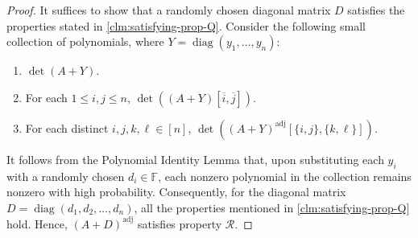 \documentclass[11pt,letterpaper]{article}
\DeclareMathOperator*{\diag}{diag}
\newcommand{\comp}[1]{\overline{#1}}
\newcommand{\F}{\mathbb{F}}
\DeclareMathOperator{\ad}{adj}
\newcommand{\adj}[1]{(#1)^{\ad}}
\newcommand{\PME}{\stackrel{\mathclap{\scalebox{.4}{\mbox{PME}}}}{=}}
\newcommand{\kPME}[3]{\mathrm{PME}(#1, #2, #3)}
\newcommand{\prop}{\mathcal{R}}
\begin{document}
{{{\begin{proof}
    It suffices to show that a randomly chosen diagonal matrix $D$ satisfies the properties stated in \cref{clm:satisfying-prop-Q}. Consider the following small collection of polynomials, where $Y = \diag(y_1, \ldots, y_n)$:
    \begin{enumerate}%
        \item $\det(A+Y)$.
        \item For each $1\leq i,j \leq n$, $\det ((A + Y)[\comp{i}, \comp{j}])$.
        \item For each distinct $i,j,k,\ell\in[n]$, $\det\left(\adj{A+Y}[\{i,j\},\{k,\ell\}]\right)$. %
    \end{enumerate}
It follows from the Polynomial Identity Lemma \cite{Sch80,Zip79, DL78} that, upon substituting each $y_i$ with a randomly chosen $d_i \in \F$, each nonzero polynomial in the collection remains nonzero with high probability.  Consequently, for the diagonal matrix $D = \diag(d_1, d_2, \ldots, d_n)$, all the properties mentioned in \cref{clm:satisfying-prop-Q} hold. Hence, $\adj{A+D}$ satisfies property $\prop$.
\end{proof}


}}}
\end{document}
